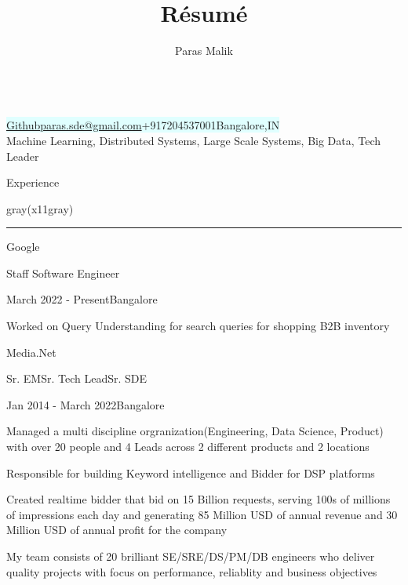 \documentclass[8pt,a4paper]{article}
\makeatletter
\renewcommand{\maketitle}{
\begin{center}
{\Huge \bfseries
\theauthor} \vspace{.25em} \\
\colorbox{lightcyan}{
\href{http://github.com/i-plusplus}{Github}{\textbar}\href{mailto:paras.sde@gmail.com}{paras.sde@gmail.com}{\textbar}+917204537001{\textbar}Bangalore,IN
} 
\\
\normalsize{Machine Learning, Distributed Systems, Large Scale Systems, Big Data, Tech Leader}

\vspace{.5em}
\end{center}
}
\makeatother
\begin{document}
\title{R\'esum\'e}
\author{Paras Malik}
\maketitle
\begin{multicols}{2}
\setlength{\columnseprule}{0.4pt}
\begin{section}{Experience}
\end{section}

\begin{color}{gray(x11gray)}\hrule\end{color}
\vspace{5mm}
\begin{expsec}{Google}
\end{expsec}
\begin{expsubsec}{Staff Software Engineer}
\end{expsubsec}
\begin{timeandlocation}March 2022 - Present{\textbar}Bangalore
\end{timeandlocation}
\begin{desc}{Worked on Query Understanding for search queries for shopping B2B inventory}
\end{desc}
\begin{expsec}{Media.Net}
\end{expsec}
\begin{expsubsec}{Sr. EM{\textbar}Sr. Tech Lead{\textbar}Sr. SDE}
\end{expsubsec}
\begin{timeandlocation}Jan 2014 - March 2022{\textbar}Bangalore
\end{timeandlocation}
\begin{desc}{Managed a multi discipline orgranization(Engineering, Data Science, Product) with over 20 people and 4 Leads across 2 different products and 2 locations}
\end{desc}
\begin{desc}{Responsible for building Keyword intelligence and Bidder for DSP platforms}
\end{desc}
\begin{desc}{Created realtime bidder that bid on 15 Billion requests, serving 100s of millions of impressions each day and generating 85 Million USD of annual revenue and 30 Million USD of annual profit for the company}
\end{desc}
\begin{desc}{My team consists of 20 brilliant SE/SRE/DS/PM/DB engineers who deliver quality projects with focus on performance, reliablity and business objectives}

\end{desc}
\end{multicols}
\end{document}
